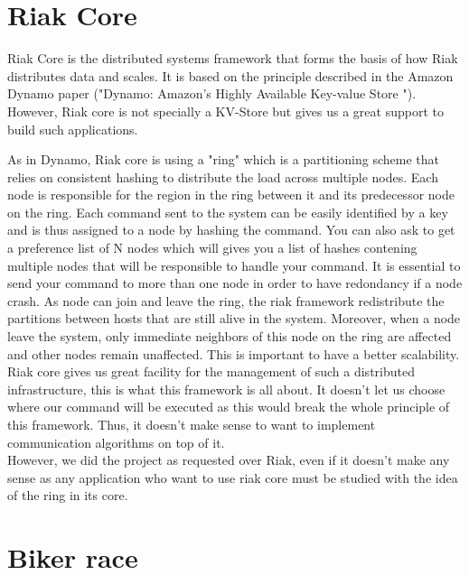 \documentclass[a4paper, 11pt]{article}
\begin{document}
\section{Riak Core}

Riak Core is the distributed systems framework that forms the basis of how Riak distributes data and scales. It is based on the principle described in the Amazon Dynamo paper ("Dynamo: Amazon’s Highly Available Key-value Store "). However, Riak core is not specially a KV-Store but gives us a great support to build such applications.

As in Dynamo, Riak core is using a "ring" which is a partitioning scheme that relies on consistent hashing to distribute the load across multiple nodes. Each node is responsible for the region in the ring between it and its predecessor node on the ring. Each command sent to the system can be easily identified by a key and is thus assigned to a node by hashing the command. You can also ask to get a preference list of N nodes which will gives you a list of hashes contening multiple nodes that will be responsible to handle your command. It is essential to send your command to more than one node in order to have redondancy if a node crash. As node can join and leave the ring, the riak framework redistribute the partitions between hosts that are still alive in the system. Moreover, when a node leave the system, only immediate neighbors of this node on the ring are affected and other nodes remain unaffected. This is important to have a better scalability.\\

Riak core gives us great facility for the management of such a distributed infrastructure, this is what this framework is all about. It doesn't let us choose where our command will be executed as this would break the whole principle of this framework. Thus, it doesn't make sense to want to implement communication algorithms on top of it. \\

However, we did the project as requested over Riak, even if it doesn't make any sense as any application who want to use riak core must be studied with the idea of the ring in its core. \\

\section{Biker race}
\end{document}
